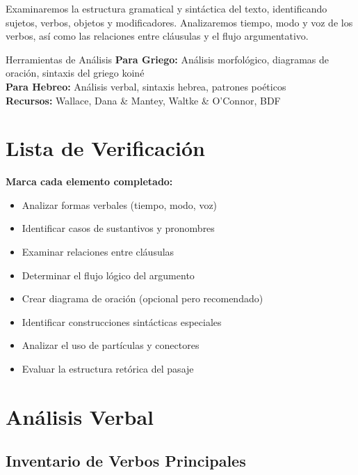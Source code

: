 \documentclass[11pt,a4paper]{article}
\begin{document}
Examinaremos la estructura gramatical y sintáctica del texto, identificando sujetos, verbos, objetos y modificadores. Analizaremos tiempo, modo y voz de los verbos, así como las relaciones entre cláusulas y el flujo argumentativo.

\begin{infobox}{Herramientas de Análisis}
\textbf{Para Griego:} Análisis morfológico, diagramas de oración, sintaxis del griego koiné\\
\textbf{Para Hebreo:} Análisis verbal, sintaxis hebrea, patrones poéticos\\
\textbf{Recursos:} Wallace, Dana \& Mantey, Waltke \& O'Connor, BDF
\end{infobox}

\section{Lista de Verificación}

\begin{checklistbox}
\textbf{Marca cada elemento completado:}

\begin{itemize}[leftmargin=1cm]
    \item[$\square$] Analizar formas verbales (tiempo, modo, voz)
    \item[$\square$] Identificar casos de sustantivos y pronombres
    \item[$\square$] Examinar relaciones entre cláusulas
    \item[$\square$] Determinar el flujo lógico del argumento
    \item[$\square$] Crear diagrama de oración (opcional pero recomendado)
    \item[$\square$] Identificar construcciones sintácticas especiales
    \item[$\square$] Analizar el uso de partículas y conectores
    \item[$\square$] Evaluar la estructura retórica del pasaje
\end{itemize}
\end{checklistbox}

\newpage

\section{Análisis Verbal}

\subsection{Inventario de Verbos Principales}
\end{document}
